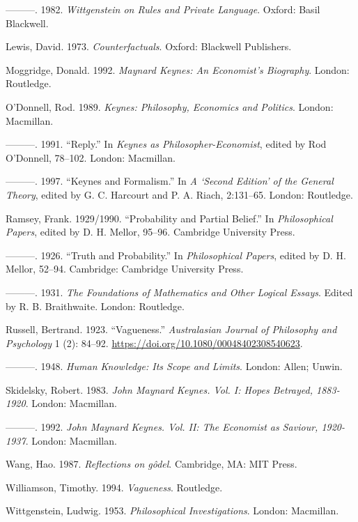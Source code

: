 \documentclass[noflushend]{philosophersimprint}
\begin{document}
\begin{CSLReferences}{1}{0}
\leavevmode\hypertarget{ref-Kripke1982}{}%
---------. 1982. \emph{Wittgenstein on Rules and Private Language}.
Oxford: Basil Blackwell.

\leavevmode\hypertarget{ref-Lewis1973a}{}%
Lewis, David. 1973. \emph{Counterfactuals}. Oxford: Blackwell
Publishers.

\leavevmode\hypertarget{ref-Moggridge1992}{}%
Moggridge, Donald. 1992. \emph{Maynard Keynes: An Economist's
Biography}. London: Routledge.

\leavevmode\hypertarget{ref-ODonnell1989}{}%
O'Donnell, Rod. 1989. \emph{Keynes: Philosophy, Economics and Politics}.
London: Macmillan.

\leavevmode\hypertarget{ref-ODonnell1991}{}%
---------. 1991. {``Reply.''} In \emph{Keynes as Philosopher-Economist},
edited by Rod O'Donnell, 78--102. London: Macmillan.

\leavevmode\hypertarget{ref-ODonnell1997}{}%
---------. 1997. {``Keynes and Formalism.''} In \emph{A {`Second
Edition'} of the General Theory}, edited by G. C. Harcourt and P. A.
Riach, 2:131--65. London: Routledge.

\leavevmode\hypertarget{ref-Ramsey1929}{}%
Ramsey, Frank. 1929/1990. {``Probability and Partial Belief.''} In
\emph{Philosophical Papers}, edited by D. H. Mellor, 95--96. Cambridge
University Press.

\leavevmode\hypertarget{ref-RamseyTruthProb}{}%
---------. 1926. {``Truth and Probability.''} In \emph{Philosophical
Papers}, edited by D. H. Mellor, 52--94. Cambridge: Cambridge University
Press.

\leavevmode\hypertarget{ref-RamseyFM}{}%
---------. 1931. \emph{The Foundations of Mathematics and Other Logical
Essays}. Edited by R. B. Braithwaite. London: Routledge.

\leavevmode\hypertarget{ref-Russell1923}{}%
Russell, Bertrand. 1923. {``Vagueness.''} \emph{Australasian Journal of
Philosophy and Psychology} 1 (2): 84--92.
\url{https://doi.org/10.1080/00048402308540623}.

\leavevmode\hypertarget{ref-Russell1948}{}%
---------. 1948. \emph{Human Knowledge: Its Scope and Limits}. London:
Allen; Unwin.

\leavevmode\hypertarget{ref-Skidelsky1983}{}%
Skidelsky, Robert. 1983. \emph{John Maynard Keynes. Vol. I: Hopes
Betrayed, 1883-1920}. London: Macmillan.

\leavevmode\hypertarget{ref-Skidelsky1992}{}%
---------. 1992. \emph{John Maynard Keynes. Vol. II: The Economist as
Saviour, 1920-1937}. London: Macmillan.

\leavevmode\hypertarget{ref-Wang1987}{}%
Wang, Hao. 1987. \emph{Reflections on gôdel}. Cambridge, MA: MIT Press.

\leavevmode\hypertarget{ref-Williamson1994-WILV}{}%
Williamson, Timothy. 1994. \emph{{Vagueness}}. Routledge.

\leavevmode\hypertarget{ref-Wittgenstein1953}{}%
Wittgenstein, Ludwig. 1953. \emph{Philosophical Investigations}. London:
Macmillan.

\end{CSLReferences}

\printbibliography
\end{document}
